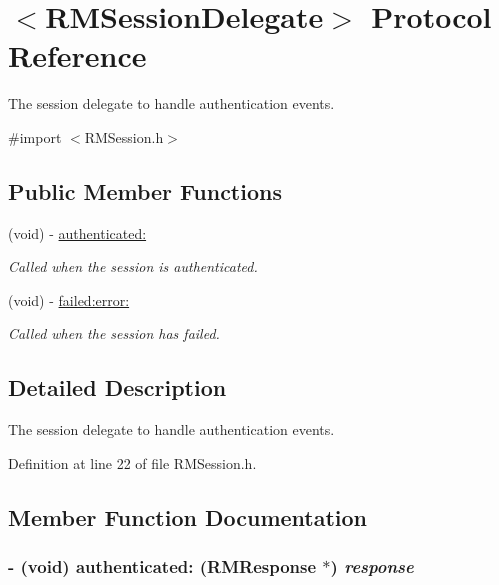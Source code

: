 \hypertarget{protocol_r_m_session_delegate-p}{
\section{$<$RMSessionDelegate$>$ Protocol Reference}
\label{protocol_r_m_session_delegate-p}
}


The session delegate to handle authentication events.  


{\ttfamily \#import $<$RMSession.h$>$}\subsection*{Public Member Functions}
\begin{DoxyCompactItemize}
\item 
(void) -\/ \hyperlink{protocol_r_m_session_delegate-p_a98f46b6b58c6b7e5ec6d44e3bd22def6}{authenticated:}
\begin{DoxyCompactList}\small\item\em Called when the session is authenticated. \item\end{DoxyCompactList}\item 
(void) -\/ \hyperlink{protocol_r_m_session_delegate-p_acc1de0a74fa842d993eb9b6d33cd6e38}{failed:error:}
\begin{DoxyCompactList}\small\item\em Called when the session has failed. \item\end{DoxyCompactList}\end{DoxyCompactItemize}


\subsection{Detailed Description}
The session delegate to handle authentication events. 

Definition at line 22 of file RMSession.h.

\subsection{Member Function Documentation}
\hypertarget{protocol_r_m_session_delegate-p_a98f46b6b58c6b7e5ec6d44e3bd22def6}{
\subsubsection[{authenticated:}]{\setlength{\rightskip}{0pt plus 5cm}-\/ (void) authenticated: ({\bf RMResponse} $\ast$) {\em response}}}
\label{protocol_r_m_session_delegate-p_a98f46b6b58c6b7e5ec6d44e3bd22def6}


